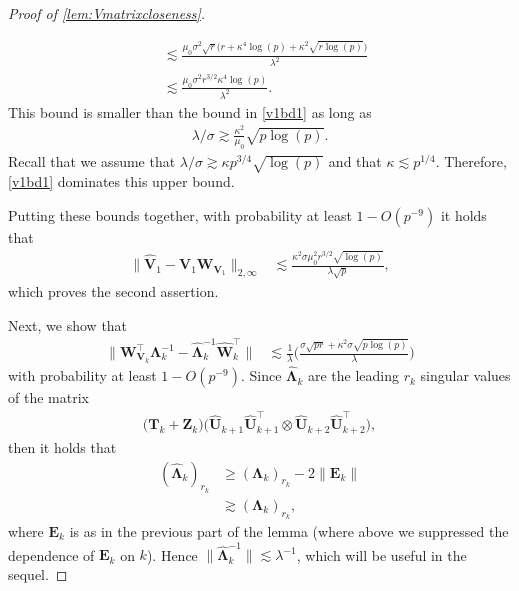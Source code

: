 \documentclass[10pt]{article}
\newcommand{\0}{{\mathbf{0}}}
\newcommand{\1}{{\mathbf{1}}}
\renewcommand{\t}{^{\top}}
\newcommand{\uhat}{\mathbf{\hat{U}}}
\newcommand{\inv}{^{-1}}
\renewcommand{\hat}{\widehat}
\renewcommand{\hat}{\widehat}
\begin{document}
\begin{proof}[Proof of \cref{lem:Vmatrixcloseness}]
\begin{itemize}
\begin{align*}
    &\lesssim \frac{\mu_0 \sigma^2 \sqrt{r} \big( r + \kappa^4 \log(p) + \kappa^2 \sqrt{r\log(p)}\big)}{\lambda^2} \\
    &\lesssim \frac{\mu_0 \sigma^2 r^{3/2} \kappa^4 \log(p)}{\lambda^2}.
\end{align*}
This bound is smaller than the bound in \eqref{v1bd1} as long as
\begin{align*}
    \lambda/\sigma \gtrsim \frac{\kappa^2}{\mu_0} \sqrt{p\log(p)}.
\end{align*}
Recall that we assume that $\lambda/\sigma \gtrsim \kappa p^{3/4} \sqrt{\log(p)}$ and that $\kappa \lesssim p^{1/4}$.  Therefore, \eqref{v1bd1} dominates this upper bound.
\end{itemize}
Putting these bounds together, with probability at least $1 - O(p^{-9})$ it holds that
\begin{align*}
    \| \mathbf{\hat V}_1 - \mathbf{V}_1 \mathbf{W}_{\mathbf{V}_1} \|_{2,\infty} &\lesssim \frac{\kappa^2 \sigma \mu_0^2 r^{3/2} \sqrt{\log(p)}}{\lambda \sqrt{p}},
\end{align*}
which proves the second assertion.

Next, we show that
\begin{align*}
     \| \mathbf{W}_{\mathbf{V}_k}\t \mathbf{\Lambda}_k\inv - \mathbf{\hat{\Lambda}}_k\inv \mathbf{\hat W}_k\t \| &\lesssim \frac{1}{\lambda} \bigg( \frac{\sigma \sqrt{pr} + \kappa^2 \sigma \sqrt{p\log(p)}}{\lambda} \bigg)
\end{align*}
with probability at least $1 - O(p^{-9})$.  
Since $\mathbf{\hat{\Lambda}}_k$ are the leading $r_k$ singular values of the matrix 
\begin{align*}
  \big( \mathbf{T}_k + \mathbf{Z}_k \big) \big( \uhat_{k+1}\uhat_{k+1}\t \otimes \uhat_{k+2} \uhat_{k+2}\t \big),
\end{align*}
then it holds that
\begin{align*}
(\mathbf{\hat{\Lambda}}_k)_{r_k} &\geq (\mathbf{\Lambda}_k)_{r_k}  - 2 \| \mathbf{E}_k \| \\
&\gtrsim (\mathbf{\Lambda}_k)_{r_k},
\end{align*}
where $\mathbf{E}_k$ is as in the previous part of the lemma (where above we suppressed the dependence of $\mathbf{E}_k$ on $k$). Hence $\| \mathbf{\hat{\Lambda}}_k\inv \| \lesssim \lambda\inv$, which will be useful in the sequel. 


\end{proof}
\end{document}
